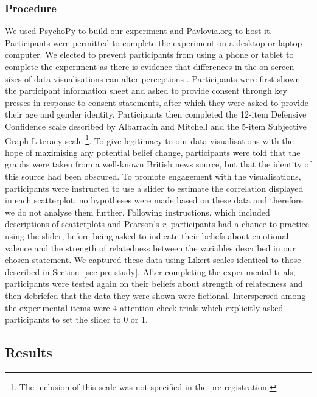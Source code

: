 \documentclass[sigconf]{acmart}
\begin{document}
\subsubsection{Procedure}\label{sec-procedure-main}

We used PsychoPy \citep{pierce_2019} to build our experiment and
Pavlovia.org to host it. Participants were permitted to complete the
experiment on a desktop or laptop computer. We elected to prevent
participants from using a phone or tablet to complete the experiment as
there is evidence that differences in the on-screen sizes of data
visualisations can alter perceptions \citep{cleveland_1982}.
Participants were first shown the participant information sheet and
asked to provide consent through key presses in response to consent
statements, after which they were asked to provide their age and gender
identity. Participants then completed the 12-item Defensive Confidence
scale described by Albarracín and Mitchell \citep{albarracin_2004} and
the 5-item Subjective Graph Literacy scale \citep{garcia_2016}
\footnote{The inclusion of this scale was not specified in the
  pre-registration.}. To give legitimacy to our data visualisations with
the hope of maximising any potential belief change, participants were
told that the graphs were taken from a well-known British news source,
but that the identity of this source had been obscured. To promote
engagement with the visualisations, participants were instructed to use
a slider to estimate the correlation displayed in each scatterplot; no
hypotheses were made based on these data and therefore we do not analyse
them further. Following instructions, which included descriptions of
scatterplots and Pearson's \emph{r}, participants had a chance to
practice using the slider, before being asked to indicate their beliefs
about emotional valence and the strength of relatedness between the
variables described in our chosen statement. We captured these data
using Likert scales identical to those described in
Section~\ref{sec-pre-study}. After completing the experimental trials,
participants were tested again on their beliefs about strength of
relatedness and then debriefed that the data they were shown were
fictional. Interspersed among the experimental items were 4 attention
check trials which explicitly asked participants to set the slider to 0
or 1.

\subsection{Results}\label{sec-results-main}
\end{document}
